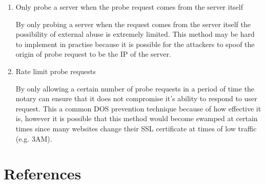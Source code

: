 \documentclass[preprint,review,12pt]{elsarticle}
\begin{document}
\begin{enumerate}
    \item {Only probe a server when the probe request comes from the server itself}

        By only probing a server when the request comes from the server itself
        the possibility of external abuse is extremely limited. This method may
        be hard to implement in practise because it is possible for the
        attackers to spoof the origin of probe request to be the IP of the
        server.

    \item {Rate limit probe requests}

        By only allowing a certain number of probe requests in a period of time
        the notary can ensure that it does not compromise it's ability to
        respond to user request. This a common DOS prevention technique because
        of how effective it is, however it is possible that this method would
        become swamped at certain times since many websites change their SSL
        certificate at times of low traffic (e.g. 3AM).

\end{enumerate}

\section{References}
\label{references}
\nocite{*}


\end{document}
